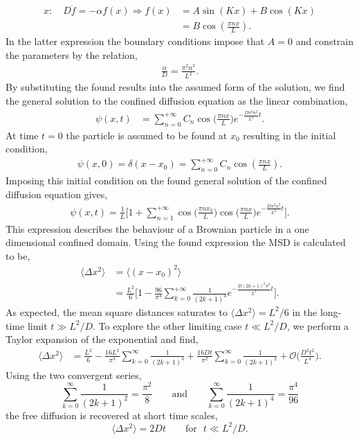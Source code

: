 \begin{align}
  x:\quad D \ddot{f} = - \alpha f(x) \Rightarrow f(x) &= A \sin(K x) + B \cos(Kx)\\
  &= B \cos(\frac{\pi n x}{L}).
\end{align}
In the latter expression the boundary conditions impose that $A=0$ and constrain the
parameters by the relation,
\begin{align}
  \frac{\alpha}{D} = \frac{\pi^2 n^2}{L^2}.
\end{align}
By substituting the found results into the assumed form of the solution, we find the
general solution to the confined diffusion equation as the linear combination,
\begin{align}
  \psi(x,t) &= \sum_{n=0}^{+\infty} C_n \cos\Big(\frac{\pi n x}{L}\Big) e^{- \frac{D\pi^2
  n^2}{L^2}t}.
\end{align}
At time $t=0$ the particle is assumed to be found at $x_0$ resulting in the initial
condition,
\begin{align}
  \psi(x, 0) = \delta(x-x_0) = \sum_{n=0}^{+ \infty} C_n \cos(\frac{\pi n x}{L}).
\end{align}
Imposing this initial condition on the found general solution of the confined diffusion
equation gives,
\begin{align}
  \psi(x, t)=\frac{1}{L} \Bigg[ 1 + \sum_{n=1}^{+\infty} \cos\Big(\frac{\pi n
  x_0}{L}\Big) \cos\Big(\frac{\pi n x}{L}\Big) e^{- \frac{D\pi^2  n^2}{L^2}t}\Bigg].
\end{align}
This expression describes the behaviour of a Brownian particle in a one dimensional
confined domain. Using the found expression the MSD is calculated to be,
\begin{align}
  \langle \Delta x^2 \rangle &= \langle(x-x_0)^2\rangle\\&= \frac{L^2}{6}\Bigg[1 -
  \frac{96}{\pi^4}
  \sum_{k=0}^{+\infty} \frac{1}{(2k+1)^4} e^{- \frac{D(2k+1)^2 \pi^2}{L^2}t}\Bigg].
\end{align}
As expected, the mean square distances saturates to $\langle \Delta x^2 \rangle = L^2/6$
in the long-time limit $t \gg L^2 / D.$ To explore the other limiting case $t \ll L^2/D
$, we perform a Taylor expansion of the exponential and find,
\begin{align}
  \langle \Delta x^2 \rangle &= \frac{L^2}{6} - \frac{16 L^2}{\pi^4} \sum_{k=0}^{\infty}
  \frac{1}{(2k+1)^4} + \frac{16 D t}{\pi^2} \sum_{k=0}^{\infty} \frac{1}{(2k+1)^2} +
  \mathcal{O}\bigg(\frac{D^2 t^2}{L^4}\bigg).
\end{align}
Using the two convergent series,
\begin{equation}
  \sum_{k=0}^{\infty} \frac{1}{(2k+1)^2} = \frac{\pi^2}{8} \qquad \text{and} \qquad
  \sum_{k=0}^{\infty} \frac{1}{(2k+1)^4} = \frac{\pi^4}{96}
\end{equation}
the free diffusion is recovered at short time scales,\cite{BICKEL200724}
\begin{equation}
  \langle \Delta x^2 \rangle = 2Dt \qquad \text{for }\,\, t \ll L^2/D.
\end{equation}
